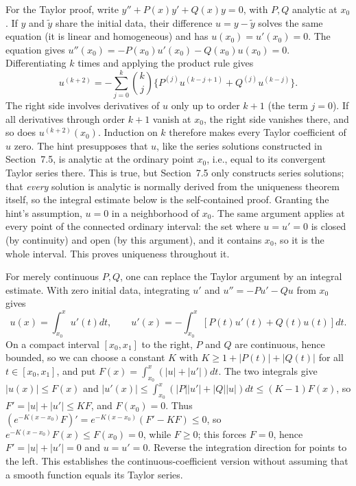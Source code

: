 For the Taylor proof, write $y''+P(x)y'+Q(x)y=0$, with $P,Q$ analytic
at $x_0$. If $y$ and $\widetilde y$ share the initial data, their
difference $u=y-\widetilde y$ solves the same equation (it is linear and
homogeneous) and has $u(x_0)=u'(x_0)=0$. The equation gives
$u''(x_0)=-P(x_0)u'(x_0)-Q(x_0)u(x_0)=0$.
Differentiating $k$ times and applying the product rule gives
\[
u^{(k+2)}=-\sum_{j=0}^k\binom kj
 \{P^{(j)}u^{(k-j+1)}+Q^{(j)}u^{(k-j)}\}.
\]
The right side involves derivatives of $u$ only up to order $k+1$ (the
term $j=0$). If all derivatives through order $k+1$ vanish at $x_0$, the
right side vanishes there, and so does $u^{(k+2)}(x_0)$. Induction on $k$
therefore makes every Taylor coefficient of $u$ zero. The hint
presupposes that $u$, like the series solutions constructed in
Section~7.5, is analytic at the ordinary point $x_0$, i.e., equal to its
convergent Taylor series there. This is true, but Section~7.5 only
constructs series solutions; that \emph{every} solution is analytic is
normally derived from the uniqueness theorem itself, so the integral
estimate below is the self-contained proof. Granting the hint's
assumption, $u=0$ in a neighborhood of $x_0$. The same argument
applies at every point of the connected ordinary interval: the set where $u=u'=0$ is closed (by continuity) and open (by
this argument), and it contains $x_0$, so it is the whole interval. This
proves uniqueness throughout it.

For merely continuous $P,Q$, one can replace the Taylor argument by an
integral estimate. With zero initial data, integrating $u'$ and
$u''=-Pu'-Qu$ from $x_0$ gives
\[
u(x)=\int_{x_0}^xu'(t)dt,\qquad
u'(x)=-\int_{x_0}^x[P(t)u'(t)+Q(t)u(t)]dt.
\]
On a compact interval $[x_0,x_1]$ to the right, $P$ and $Q$ are
continuous, hence bounded, so we can choose a constant $K$ with
$K\ge1+|P(t)|+|Q(t)|$ for all $t\in[x_0,x_1]$, and put
$F(x)=\int_{x_0}^x(|u|+|u'|)dt$. The two integrals give
$|u(x)|\le F(x)$ and
$|u'(x)|\le\int_{x_0}^x(|P||u'|+|Q||u|)dt\le(K-1)F(x)$, so
$F'=|u|+|u'|\le KF$, and $F(x_0)=0$.
Thus $(e^{-K(x-x_0)}F)'=e^{-K(x-x_0)}(F'-KF)\le0$, so
$e^{-K(x-x_0)}F(x)\le F(x_0)=0$, while $F\ge0$; this forces $F=0$, hence
$F'=|u|+|u'|=0$ and
$u=u'=0$. Reverse the integration direction for points to the left.
This establishes the continuous-coefficient version without assuming that
a smooth function equals its Taylor series.

